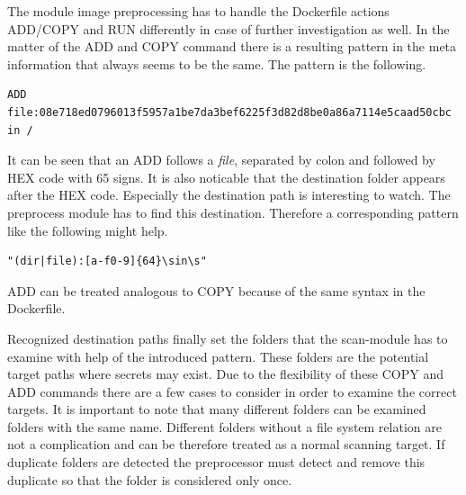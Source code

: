 The module image preprocessing has to handle the Dockerfile actions ADD/COPY and RUN differently in case of further investigation as well.
In the matter of the ADD and COPY command there is a resulting pattern in the meta information that always seems to be the same.
The pattern is the following.
\begin{lstlisting}
ADD file:08e718ed0796013f5957a1be7da3bef6225f3d82d8be0a86a7114e5caad50cbc in /
\end{lstlisting}
It can be seen that an ADD follows a \textit{file}, separated by colon and followed by HEX code with 65 signs. 
It is also noticable that the destination folder appears after the HEX code.
Especially the destination path is interesting to watch. 
The preprocess module has to find this destination. 
Therefore a corresponding pattern like the following might help.
\begin{lstlisting}
"(dir|file):[a-f0-9]{64}\sin\s"
\end{lstlisting}
ADD can be treated analogous to COPY because of the same syntax in the Dockerfile.

Recognized destination paths finally set the folders that the scan-module has to examine with help of the introduced pattern. 
These folders are the potential target paths where secrets may exist.
Due to the flexibility of these COPY and ADD commands there are a few cases to consider in order to examine the correct targets.
It is important to note that many different folders can be examined folders with the same name.
Different folders without a file system relation are not a complication and can be therefore treated as a normal scanning target. 
If duplicate folders are detected the preprocessor must detect and remove this duplicate so that the folder is considered only once.

